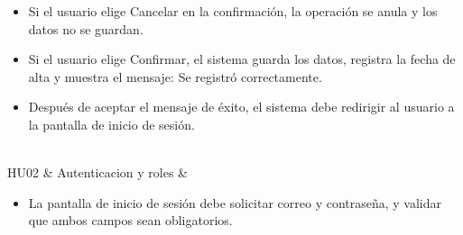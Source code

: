 \documentclass[12pt,a4paper,oneside]{report}
\begin{document}
\begin{longtable}[]
\begin{minipage}[t]{\linewidth}
\begin{itemize}
  los botones Cancelar y Confirmar.
\item
  Si el usuario elige Cancelar en la confirmación, la operación se anula
  y los datos no se guardan.
\item
  Si el usuario elige Confirmar, el sistema guarda los datos, registra
  la fecha de alta y muestra el mensaje: Se registró correctamente.
\item
  Después de aceptar el mensaje de éxito, el sistema debe redirigir al
  usuario a la pantalla de inicio de sesión.
\end{itemize}
\end{minipage} \\
HU02 & Autenticacion y roles &
\begin{minipage}[t]{\linewidth}\raggedright
\begin{itemize}
\item
  La pantalla de inicio de sesión debe solicitar correo y contraseña, y
  validar que ambos campos sean obligatorios.
\end{itemize}


\end{minipage}
\end{longtable}
\end{document}

